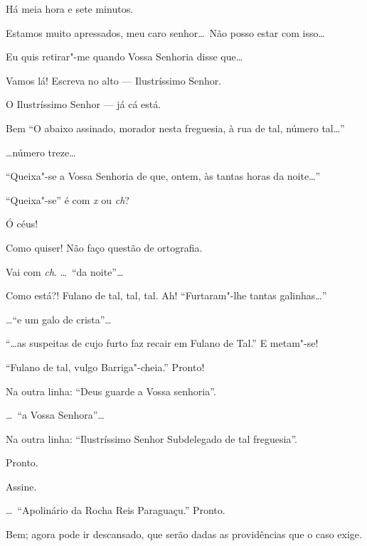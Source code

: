   Há meia hora e sete minutos.

 Estamos muito apressados, meu caro senhor\ldots\ Não posso estar
com isso\ldots

 Eu quis retirar"-me quando Vossa Senhoria disse que\ldots

 Vamos lá! Escreva no alto --- Ilustríssimo Senhor.

 O Ilustríssimo Senhor --- já cá está.

 Bem  “O abaixo assinado, morador nesta
freguesia, à rua de tal, número tal\ldots”

  \ldots número treze\ldots

 “Queixa"-se a Vossa Senhoria de que, ontem, às tantas horas da
noite\ldots”

 “Queixa"-se” é com \textit{x} ou \textit{ch}?

 Ó céus! 

 Como quiser! Não faço questão de ortografia.

 Vai com \textit{ch}. \ldots\ “da noite”\ldots

 Como está?!  Fulano de tal, tal, tal. Ah!
 “Furtaram"-lhe tantas galinhas\ldots”

  \ldots``e um galo de crista”\ldots

 “\ldots as suspeitas de cujo furto faz recair em Fulano de Tal.”
 E metam"-se!

  “Fulano de tal, vulgo
Barriga"-cheia.” Pronto!

 Na outra linha: “Deus guarde a Vossa senhoria”.

 \ldots\ “a Vossa Senhora”\ldots

 Na outra linha: “Ilustríssimo Senhor Subdelegado de tal
freguesia”.

 Pronto.

 Assine.

 \ldots\ “Apolinário da Rocha Reis Paraguaçu.”
 Pronto.

 Bem; agora pode ir descansado, que serão dadas as providências
que o caso exige.

